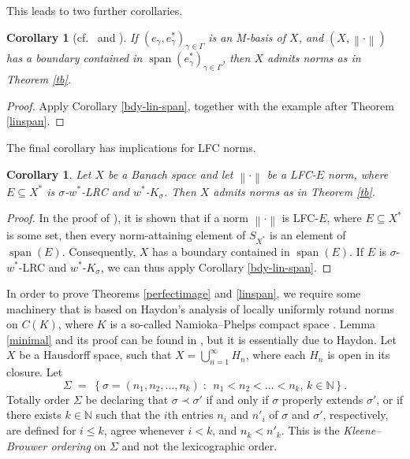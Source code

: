 \documentclass[12pt,reqno]{amsart}
\newcommand{\N}{\mathbb{N}}
\newcommand{\ndot}{\ensuremath{\left\|\cdot\right\|}}
\newcommand{\set}[2]{\ensuremath{\left\{{#1}\;:\;\,{#2}\right\}}}
\newcommand{\weakstar}{\ensuremath{w^*}}
\DeclareMathOperator{\aspan}{span}
\newtheorem{cor}[thm]{Corollary}
\theoremstyle{definition}
\begin{document}
This leads to two further corollaries.

\begin{cor}[cf.\ {\cite[Corollary 3.5]{bible:14} and \cite[Corollary 14]{fpst:14}}]\label{M-basis} If $(e_\gamma,e^*_\gamma)_{\gamma \in \Gamma}$ is an M-basis of $X$, and $(X,\ndot)$ has a boundary contained in $\aspan(e^*_\gamma)_{\gamma \in \Gamma}$, then $X$ admits norms as in Theorem \ref{tb}.
\end{cor}

\begin{proof}
Apply Corollary \ref{bdy-lin-span}, together with the example after Theorem \ref{linspan}.
\end{proof}

The final corollary has implications for LFC norms. 

\begin{cor}\label{LFC}
Let $X$ be a Banach space and let $\ndot$ be a LFC-$E$ norm, where $E\subseteq X^*$ is $\sigma$-$\weakstar$-LRC and $\weakstar$-$K_\sigma$. Then $X$ admits norms as in Theorem \ref{tb}.
\end{cor}

\begin{proof}
In the proof of \cite[Theorem 1]{hajek:95}), it is shown that if a norm $\ndot$ is LFC-$E$, where $E \subseteq X^*$ is some set, then every norm-attaining element of $S_{X^*}$ is an element of $\aspan(E)$. Consequently, $X$ has a boundary contained in $\aspan(E)$. If $E$ is $\sigma$-$\weakstar$-LRC and $\weakstar$-$K_\sigma$, we can thus apply Corollary \ref{bdy-lin-span}.
\end{proof}

In order to prove Theorems \ref{perfectimage} and \ref{linspan}, we require some machinery that is based on Haydon's analysis of locally uniformly rotund norms on $C(K)$, where $K$ is a so-called Namioka--Phelps compact space \cite{haydon:08}. Lemma \ref{minimal} and its proof can be found in \cite{ks:15}, but it is essentially due to Haydon. Let $X$ be a Hausdorff space, such that $X=\bigcup_{n=1}^\infty H_n$, where each $H_n$ is open in its closure. Let
\[
\Sigma \;=\; \set{\sigma=(n_1,n_2,\dots,n_k)}{n_1 < n_2 < \dots < n_k,\, k \in \N}.
\]
Totally order $\Sigma$ be declaring that $\sigma \prec \sigma'$ if and only if $\sigma$ properly extends $\sigma'$, or if there exists $k \in \N$ such that the $i$th entries $n_i$ and $n'_i$ of $\sigma$ and $\sigma'$, respectively, are defined for $i \leqslant k$, agree whenever $i < k$, and $n_k < n'_k$. This is the {\em Kleene--Brouwer ordering} on $\Sigma$ and not the lexicographic order.
\end{document}
